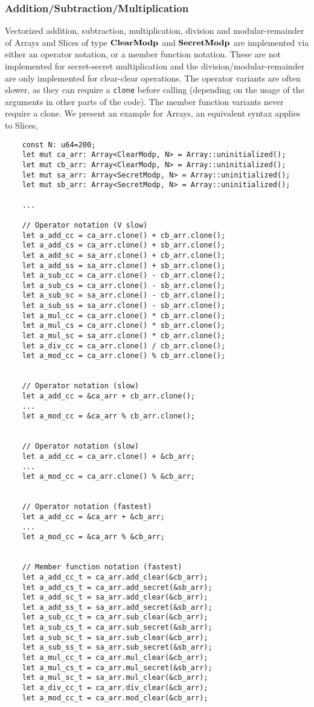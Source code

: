 \subsubsection{Addition/Subtraction/Multiplication}
Vectorized addition, subtraction, multiplication, division and modular-remainder
of Arrays and Slices of type $\mathbf{ClearModp}$ and $\mathbf{SecretModp}$ 
are implemented via either an operator notation, or a member function notation.
These are not implemented for secret-secret multiplication and the 
division/modular-remainder are only implemented for clear-clear operations.
The operator variants are often slower, as they can require a \verb|clone|
before calling (depending on the usage of the arguments in other parts of
the code).
The member function variants never require a clone.
We present an example for Arrays, an equivalent syntax applies to Slices,
\begin{lstlisting}
    const N: u64=200;
    let mut ca_arr: Array<ClearModp, N> = Array::uninitialized();
    let mut cb_arr: Array<ClearModp, N> = Array::uninitialized();
    let mut sa_arr: Array<SecretModp, N> = Array::uninitialized();
    let mut sb_arr: Array<SecretModp, N> = Array::uninitialized();

    ...

    // Operator notation (V slow)
    let a_add_cc = ca_arr.clone() + cb_arr.clone();
    let a_add_cs = ca_arr.clone() + sb_arr.clone();
    let a_add_sc = sa_arr.clone() + cb_arr.clone();
    let a_add_ss = sa_arr.clone() + sb_arr.clone();
    let a_sub_cc = ca_arr.clone() - cb_arr.clone();
    let a_sub_cs = ca_arr.clone() - sb_arr.clone();
    let a_sub_sc = sa_arr.clone() - cb_arr.clone();
    let a_sub_ss = sa_arr.clone() - sb_arr.clone();
    let a_mul_cc = ca_arr.clone() * cb_arr.clone();
    let a_mul_cs = ca_arr.clone() * sb_arr.clone();
    let a_mul_sc = sa_arr.clone() * cb_arr.clone();
    let a_div_cc = ca_arr.clone() / cb_arr.clone();
    let a_mod_cc = ca_arr.clone() % cb_arr.clone();

    
    // Operator notation (slow)
    let a_add_cc = &ca_arr + cb_arr.clone();
    ...
    let a_mod_cc = &ca_arr % cb_arr.clone();


    // Operator notation (slow)
    let a_add_cc = ca_arr.clone() + &cb_arr;
    ...
    let a_mod_cc = ca_arr.clone() % &cb_arr;


    // Operator notation (fastest)
    let a_add_cc = &ca_arr + &cb_arr;
    ...
    let a_mod_cc = &ca_arr % &cb_arr;


    // Member function notation (fastest)
    let a_add_cc_t = ca_arr.add_clear(&cb_arr);
    let a_add_cs_t = ca_arr.add_secret(&sb_arr);
    let a_add_sc_t = sa_arr.add_clear(&cb_arr);
    let a_add_ss_t = sa_arr.add_secret(&sb_arr);
    let a_sub_cc_t = ca_arr.sub_clear(&cb_arr);
    let a_sub_cs_t = ca_arr.sub_secret(&sb_arr);
    let a_sub_sc_t = sa_arr.sub_clear(&cb_arr);
    let a_sub_ss_t = sa_arr.sub_secret(&sb_arr);
    let a_mul_cc_t = ca_arr.mul_clear(&cb_arr);
    let a_mul_cs_t = ca_arr.mul_secret(&sb_arr);
    let a_mul_sc_t = sa_arr.mul_clear(&cb_arr);
    let a_div_cc_t = ca_arr.div_clear(&cb_arr);
    let a_mod_cc_t = ca_arr.mod_clear(&cb_arr);
\end{lstlisting}

